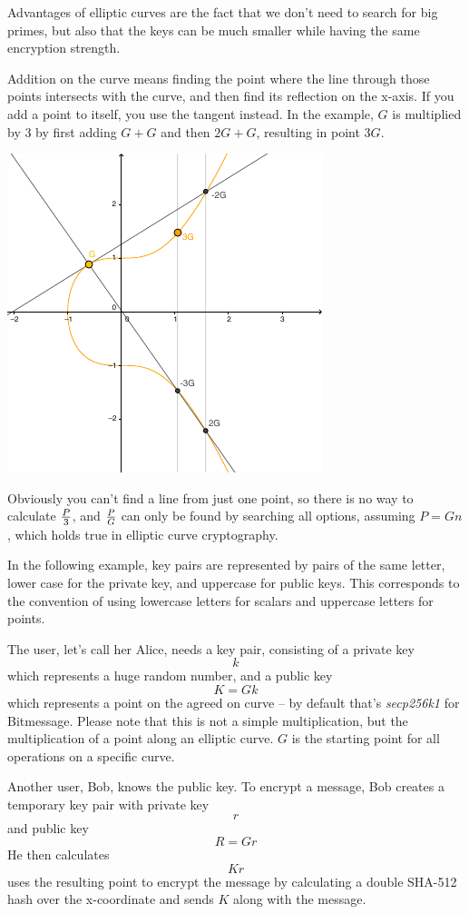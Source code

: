 \documentclass{bfh}
\begin{document}
  Advantages of elliptic curves are the fact that we don't need to search for big primes, but also that the keys can be much smaller while having the same encryption strength.

  Addition on the curve means finding the point where the line through those points intersects with the curve, and then find its reflection on the x-axis. If you add a point to itself, you use the tangent instead. In the example, $G$ is multiplied by 3 by first adding $G+G$ and then $2G+G$, resulting in point $3G$.

  \begin{center}
    \includegraphics[width=0.5 \textwidth]{images/multiplication_on_elliptic_curve.pdf}
  \end{center}

  Obviously you can't find a line from just one point, so there is no way to calculate $P \over 3$, and $P \over G$ can only be found by searching all options, assuming $P = G n$, which holds true in elliptic curve cryptography.

  In the following example, key pairs are represented by pairs of the same letter, lower case for the private key, and uppercase for public keys. This corresponds to the convention of using lowercase letters for scalars and uppercase letters for points.

  The user, let's call her Alice, needs a key pair, consisting of a private key
$$k$$
which represents a huge random number, and a public key
$$K = G k$$
which represents a point on the agreed on curve -- by default that's \textit{secp256k1} for Bitmessage. Please note that this is not a simple multiplication, but the multiplication of a point along an elliptic curve. $G$ is the starting point for all operations on a specific curve.

  Another user, Bob, knows the public key. To encrypt a message, Bob creates a temporary key pair with private key
$$r$$
and public key
$$R = G r$$
He then calculates
$$K r$$
uses the resulting point to encrypt the message by calculating a double SHA-512 hash over the x-coordinate and sends $K$ along with the message.
\end{document}
